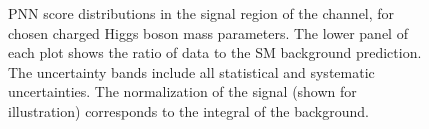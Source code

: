 \begin{figure}
			  \caption{\label{fig:taujets_SR_PNNscores_body-1} \gls{PNN} score distributions in the
			signal region of the \taujets channel, for chosen charged Higgs boson mass parameters.
			The lower panel of each plot shows the ratio of data to the \acrshort{SM} background prediction. The uncertainty bands include all statistical and systematic uncertainties. 
			The normalization of the signal (shown for illustration) corresponds to the integral of the background.}
		\end{figure}


